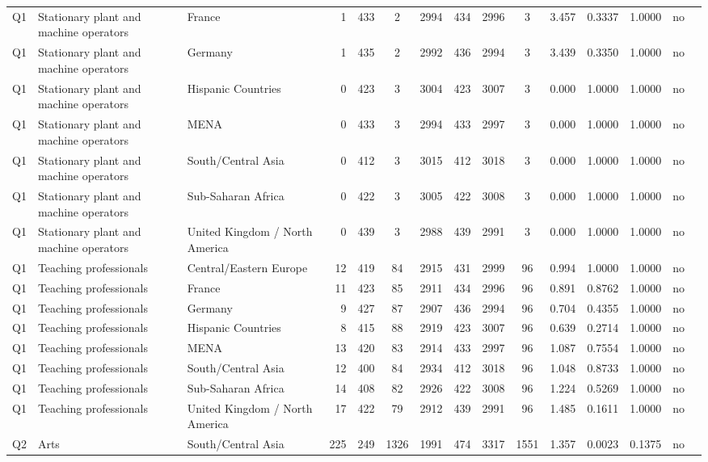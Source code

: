 \begin{longtable}{lllrcccccccccll}
Q1 & Stationary plant and machine operators & France & 1 & 433 & 2 & 2994 & 434 & 2996 & 3 & 3.457 & 0.3337 & 1.0000 & no \\
Q1 & Stationary plant and machine operators & Germany & 1 & 435 & 2 & 2992 & 436 & 2994 & 3 & 3.439 & 0.3350 & 1.0000 & no \\
Q1 & Stationary plant and machine operators & Hispanic Countries & 0 & 423 & 3 & 3004 & 423 & 3007 & 3 & 0.000 & 1.0000 & 1.0000 & no \\
Q1 & Stationary plant and machine operators & MENA & 0 & 433 & 3 & 2994 & 433 & 2997 & 3 & 0.000 & 1.0000 & 1.0000 & no \\
Q1 & Stationary plant and machine operators & South/Central Asia & 0 & 412 & 3 & 3015 & 412 & 3018 & 3 & 0.000 & 1.0000 & 1.0000 & no \\
Q1 & Stationary plant and machine operators & Sub-Saharan Africa & 0 & 422 & 3 & 3005 & 422 & 3008 & 3 & 0.000 & 1.0000 & 1.0000 & no \\
Q1 & Stationary plant and machine operators & United Kingdom / North America & 0 & 439 & 3 & 2988 & 439 & 2991 & 3 & 0.000 & 1.0000 & 1.0000 & no \\
Q1 & Teaching professionals & Central/Eastern Europe & 12 & 419 & 84 & 2915 & 431 & 2999 & 96 & 0.994 & 1.0000 & 1.0000 & no \\
Q1 & Teaching professionals & France & 11 & 423 & 85 & 2911 & 434 & 2996 & 96 & 0.891 & 0.8762 & 1.0000 & no \\
Q1 & Teaching professionals & Germany & 9 & 427 & 87 & 2907 & 436 & 2994 & 96 & 0.704 & 0.4355 & 1.0000 & no \\
Q1 & Teaching professionals & Hispanic Countries & 8 & 415 & 88 & 2919 & 423 & 3007 & 96 & 0.639 & 0.2714 & 1.0000 & no \\
Q1 & Teaching professionals & MENA & 13 & 420 & 83 & 2914 & 433 & 2997 & 96 & 1.087 & 0.7554 & 1.0000 & no \\
Q1 & Teaching professionals & South/Central Asia & 12 & 400 & 84 & 2934 & 412 & 3018 & 96 & 1.048 & 0.8733 & 1.0000 & no \\
Q1 & Teaching professionals & Sub-Saharan Africa & 14 & 408 & 82 & 2926 & 422 & 3008 & 96 & 1.224 & 0.5269 & 1.0000 & no \\
Q1 & Teaching professionals & United Kingdom / North America & 17 & 422 & 79 & 2912 & 439 & 2991 & 96 & 1.485 & 0.1611 & 1.0000 & no \\
Q2 & Arts & South/Central Asia & 225 & 249 & 1326 & 1991 & 474 & 3317 & 1551 & 1.357 & 0.0023 & 0.1375 & no \\

\end{longtable}
